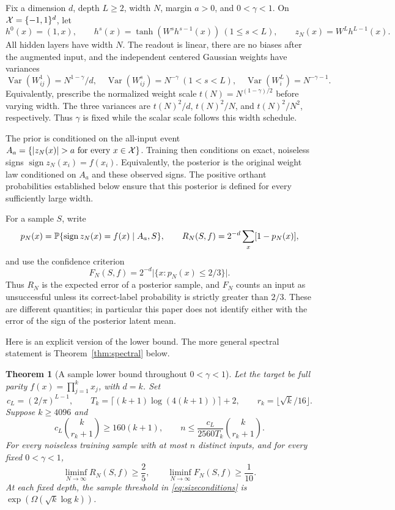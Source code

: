 \documentclass[11pt]{article}
\newtheorem{theorem}{Theorem}[section]
\theoremstyle{remark}\newtheorem{remark}[theorem]{Remark}
\DeclareMathOperator{\sign}{sign}\DeclareMathOperator{\Var}{Var}
\begin{document}
Fix a dimension $d$, depth $L\ge2$, width $N$, margin $a>0$, and
$0<\gamma<1$. On $\mathcal X=\{-1,1\}^d$, let
\[
 h^0(x)=(1,x),\qquad h^s(x)=\tanh(W^s h^{s-1}(x))\ (1\le s<L),
 \qquad z_N(x)=W^L h^{L-1}(x).
\]
All hidden layers have width $N$. The readout is linear, there are no
biases after the augmented input, and the independent centered Gaussian
weights have variances
\begin{equation}\label{eq:weights}
 \Var(W^1_{ij})=N^{1-\gamma}/d,\quad
 \Var(W^s_{ij})=N^{-\gamma}\ (1<s<L),\quad
 \Var(W^L_i)=N^{-\gamma-1}.
\end{equation}
Equivalently, prescribe the normalized weight scale
$t(N)=N^{(1-\gamma)/2}$ before varying width. The three variances are
$t(N)^2/d$, $t(N)^2/N$, and $t(N)^2/N^2$, respectively.
Thus $\gamma$ is fixed while the scalar scale follows this width schedule.

The prior is conditioned on the all-input event
$A_a=\{|z_N(x)|>a\text{ for every }x\in\X\}$.
Training then conditions on exact, noiseless signs
$\sign z_N(x_i)=f(x_i)$. Equivalently, the posterior is the original
weight law conditioned on $A_a$ and these observed signs.
The positive orthant probabilities established below ensure that this
posterior is defined for every sufficiently large width.

For a sample $S$, write
\[
 p_N(x)=\Pp\{\sign z_N(x)=f(x)\mid A_a,S\},\qquad
 R_N(S,f)=2^{-d}\sum_x[1-p_N(x)],
\]
and use the confidence criterion
\begin{equation}\label{eq:confidence}
 F_N(S,f)=2^{-d}\bigl|\{x:p_N(x)\le2/3\}\bigr|.
\end{equation}
Thus $R_N$ is the expected error of a posterior sample, and $F_N$
counts an input as unsuccessful unless its correct-label probability
is strictly greater than $2/3$. These are different quantities; in
particular this paper does not identify either with the error of the
sign of the posterior latent mean.

Here is an explicit version of the lower bound. The more general
spectral statement is Theorem~\ref{thm:spectral} below.

\begin{theorem}[A sample lower bound throughout $0<\gamma<1$]
\label{thm:main}
Let the target be full parity $f(x)=\prod_{j=1}^k x_j$, with $d=k$.
Set
\[
 c_L=(2/\pi)^{L-1},\qquad
 T_k=\lceil(k+1)\log(4(k+1))\rceil+2,\qquad
 r_k=\lfloor\sqrt{k}/16\rfloor.
\]
Suppose $k\ge4096$ and
\begin{equation}\label{eq:sizeconditions}
 c_L\binom{k}{r_k+1}\ge160(k+1),\qquad
 n\le \frac{c_L}{2560T_k}\binom{k}{r_k+1}.
\end{equation}
For every noiseless training sample with at most $n$ distinct inputs,
and for every fixed $0<\gamma<1$,
\begin{equation}\label{eq:mainbounds}
 \liminf_{N\to\infty}R_N(S,f)\ge\frac25,
 \qquad
 \liminf_{N\to\infty}F_N(S,f)\ge\frac1{10}.
\end{equation}
At each fixed depth, the sample threshold in
\eqref{eq:sizeconditions} is $\exp(\Omega(\sqrt{k}\log k))$.
\end{theorem}
\end{document}
